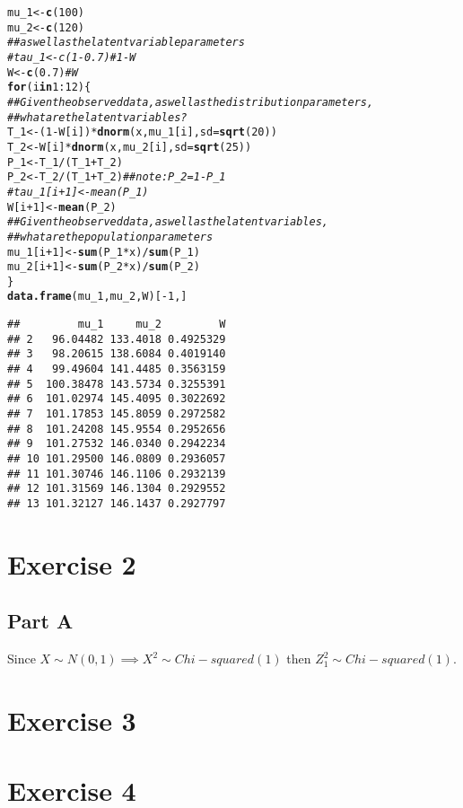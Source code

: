 \documentclass{article}\usepackage[]{graphicx}\usepackage[]{color}
\makeatletter
\newcommand{\hlnum}[1]{\textcolor[rgb]{0.686,0.059,0.569}{#1}}%
\newcommand{\hlcom}[1]{\textcolor[rgb]{0.678,0.584,0.686}{\textit{#1}}}%
\newcommand{\hlopt}[1]{\textcolor[rgb]{0,0,0}{#1}}%
\newcommand{\hlstd}[1]{\textcolor[rgb]{0.345,0.345,0.345}{#1}}%
\newcommand{\hlkwa}[1]{\textcolor[rgb]{0.161,0.373,0.58}{\textbf{#1}}}%
\newcommand{\hlkwb}[1]{\textcolor[rgb]{0.69,0.353,0.396}{#1}}%
\newcommand{\hlkwc}[1]{\textcolor[rgb]{0.333,0.667,0.333}{#1}}%
\newcommand{\hlkwd}[1]{\textcolor[rgb]{0.737,0.353,0.396}{\textbf{#1}}}%
\newenvironment{kframe}{%
 \def\at@end@of@kframe{}%
 \ifinner\ifhmode%
  \def\at@end@of@kframe{\end{minipage}}%
  \begin{minipage}{\columnwidth}%
 \fi\fi%
 \def\FrameCommand##1{\hskip\@totalleftmargin \hskip-\fboxsep
 \colorbox{shadecolor}{##1}\hskip-\fboxsep
     \hskip-\linewidth \hskip-\@totalleftmargin \hskip\columnwidth}%
 \MakeFramed {\advance\hsize-\width
   \@totalleftmargin\z@ \linewidth\hsize
   \@setminipage}}%
 {\par\unskip\endMakeFramed%
 \at@end@of@kframe}
\newenvironment{knitrout}{}{} %
\makeatother
\begin{document}
\begin{knitrout}
\begin{kframe}
\begin{alltt}
\hlstd{mu_1} \hlkwb{<-} \hlkwd{c}\hlstd{(}\hlnum{100}\hlstd{)}
\hlstd{mu_2} \hlkwb{<-} \hlkwd{c}\hlstd{(}\hlnum{120}\hlstd{)}
\hlcom{## as well as the latent variable parameters}
\hlcom{#tau_1 <- c(1-0.7) # 1-W}
\hlstd{W} \hlkwb{<-} \hlkwd{c}\hlstd{(}\hlnum{0.7}\hlstd{)} \hlcom{# W}
\hlkwa{for}\hlstd{( i} \hlkwa{in} \hlnum{1}\hlopt{:}\hlnum{12}\hlstd{) \{}
  \hlcom{## Given the observed data, as well as the distribution parameters,}
  \hlcom{## what are the latent variables?}
  \hlstd{T_1} \hlkwb{<-} \hlstd{(}\hlnum{1}\hlopt{-}\hlstd{W[i])} \hlopt{*} \hlkwd{dnorm}\hlstd{(x, mu_1[i],} \hlkwc{sd} \hlstd{=} \hlkwd{sqrt}\hlstd{(}\hlnum{20}\hlstd{))}
  \hlstd{T_2} \hlkwb{<-} \hlstd{W[i]} \hlopt{*} \hlkwd{dnorm}\hlstd{(x, mu_2[i],} \hlkwc{sd} \hlstd{=} \hlkwd{sqrt}\hlstd{(}\hlnum{25}\hlstd{))}
  \hlstd{P_1} \hlkwb{<-} \hlstd{T_1} \hlopt{/} \hlstd{(T_1} \hlopt{+} \hlstd{T_2)}
  \hlstd{P_2} \hlkwb{<-} \hlstd{T_2} \hlopt{/} \hlstd{(T_1} \hlopt{+} \hlstd{T_2)} \hlcom{## note: P_2 = 1 - P_1}
  \hlcom{#tau_1[i+1] <- mean(P_1)}
  \hlstd{W[i}\hlopt{+}\hlnum{1}\hlstd{]} \hlkwb{<-} \hlkwd{mean}\hlstd{(P_2)}
  \hlcom{## Given the observed data, as well as the latent variables,}
  \hlcom{## what are the population parameters}
  \hlstd{mu_1[i}\hlopt{+}\hlnum{1}\hlstd{]} \hlkwb{<-} \hlkwd{sum}\hlstd{( P_1} \hlopt{*} \hlstd{x)} \hlopt{/} \hlkwd{sum}\hlstd{(P_1)}
  \hlstd{mu_2[i}\hlopt{+}\hlnum{1}\hlstd{]} \hlkwb{<-} \hlkwd{sum}\hlstd{( P_2} \hlopt{*} \hlstd{x)} \hlopt{/} \hlkwd{sum}\hlstd{(P_2)}
\hlstd{\}}
\hlkwd{data.frame}\hlstd{(mu_1, mu_2, W)[}\hlopt{-}\hlnum{1}\hlstd{,]}
\end{alltt}
\begin{verbatim}
##         mu_1     mu_2         W
## 2   96.04482 133.4018 0.4925329
## 3   98.20615 138.6084 0.4019140
## 4   99.49604 141.4485 0.3563159
## 5  100.38478 143.5734 0.3255391
## 6  101.02974 145.4095 0.3022692
## 7  101.17853 145.8059 0.2972582
## 8  101.24208 145.9554 0.2952656
## 9  101.27532 146.0340 0.2942234
## 10 101.29500 146.0809 0.2936057
## 11 101.30746 146.1106 0.2932139
## 12 101.31569 146.1304 0.2929552
## 13 101.32127 146.1437 0.2927797
\end{verbatim}
\end{kframe}
\end{knitrout}
\section*{Exercise 2}
\subsection*{Part A}
Since $X\sim N(0,1) \implies X^2 \sim Chi-squared(1)$ then $Z_{1}^{2} \sim Chi-squared(1)$. 
\section*{Exercise 3}

\section*{Exercise 4}
\end{document}

